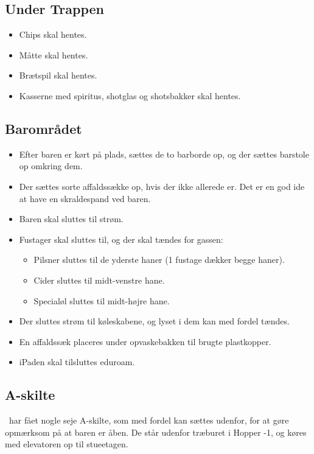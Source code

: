 \subsection{Under Trappen}
\label{sec:pre:under-trappen}

\begin{itemize}
	\item Chips skal hentes.
	\item Måtte skal hentes.
	\item Brætspil skal hentes.
	\item Kasserne med spiritus, shotglas og shotsbakker skal hentes.
\end{itemize}

\subsection{Barområdet}
\label{sec:pre:baromradet}

\begin{itemize}
	\item Efter baren er kørt på plads, sættes de to barborde op, og der sættes barstole op omkring dem.
	\item Der sættes sorte affaldssække op, hvis der ikke allerede er. 
		Det er en god ide at have en skraldespand ved baren.
	\item Baren skal sluttes til strøm.
	\item Fustager skal sluttes til, og der skal tændes for gassen:
		\begin{itemize}
		\item Pilsner sluttes til de yderste haner (1 fustage dækker begge
		haner).
		\item Cider sluttes til midt-venstre hane.
		\item Specialøl sluttes til midt-højre hane.
		\end{itemize}
	\item Der sluttes strøm til køleskabene, og lyset i dem kan med fordel tændes.
	\item En affaldssæk placeres under opvaskebakken til brugte plastkopper.
	\item iPaden skal tilsluttes eduroam.
\end{itemize}

\subsection{A-skilte}
\label{sec:pre:a-skilte}
\fredagscafeen\ har fået nogle seje A-skilte, 
som med fordel kan sættes udenfor, 
for at gøre opmærksom på at baren er åben.
De står udenfor træburet i Hopper -1, og 
køres med elevatoren op til stueetagen.


